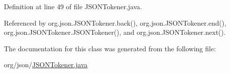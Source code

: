 Definition at line 49 of file J\-S\-O\-N\-Tokener.\-java.



Referenced by org.\-json.\-J\-S\-O\-N\-Tokener.\-back(), org.\-json.\-J\-S\-O\-N\-Tokener.\-end(), org.\-json.\-J\-S\-O\-N\-Tokener.\-J\-S\-O\-N\-Tokener(), and org.\-json.\-J\-S\-O\-N\-Tokener.\-next().



The documentation for this class was generated from the following file\-:\begin{DoxyCompactItemize}
\item 
org/json/\hyperlink{_j_s_o_n_tokener_8java}{J\-S\-O\-N\-Tokener.\-java}\end{DoxyCompactItemize}
